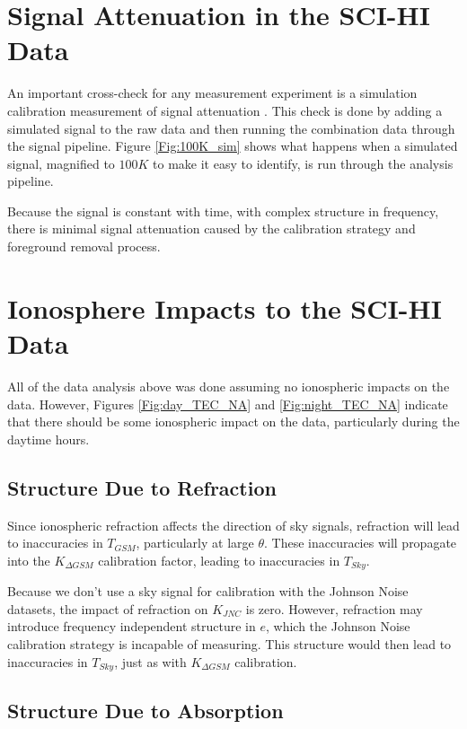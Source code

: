 \section{\cm Signal Attenuation in the SCI-HI Data}

An important cross-check for any \cm measurement experiment is a simulation calibration measurement of signal attenuation \cite{paciga_2013}. This check is done by adding a simulated \cm signal to the raw data and then running the combination data through the signal pipeline. Figure \ref{Fig:100K_sim} shows what happens when a simulated \cm signal, magnified to $100 K$ to make it easy to identify, is run through the analysis pipeline. 

Because the \cm signal is constant with time, with complex structure in frequency, there is minimal signal attenuation caused by the calibration strategy and foreground removal process. 



\section{Ionosphere Impacts to the SCI-HI Data}

All of the data analysis above was done assuming no ionospheric impacts on the data. However, Figures \ref{Fig:day_TEC_NA} and \ref{Fig:night_TEC_NA} indicate that there should be some ionospheric impact on the data, particularly during the daytime hours. 


\subsection{Structure Due to Refraction} 

Since ionospheric refraction affects the direction of sky signals, refraction will lead to inaccuracies in $T_{GSM}$, particularly at large $\theta$. These inaccuracies will propagate into the $K_{\Delta GSM}$ calibration factor, leading to inaccuracies in $T_{Sky}$. 

Because we don't use a sky signal for calibration with the Johnson Noise datasets, the impact of refraction on $K_{JNC}$ is zero. However, refraction may introduce frequency independent structure in $e$, which the Johnson Noise calibration strategy is incapable of measuring. This structure would then lead to inaccuracies in $T_{Sky}$, just as with $K_{\Delta GSM}$ calibration. 


\subsection{Structure Due to Absorption}

